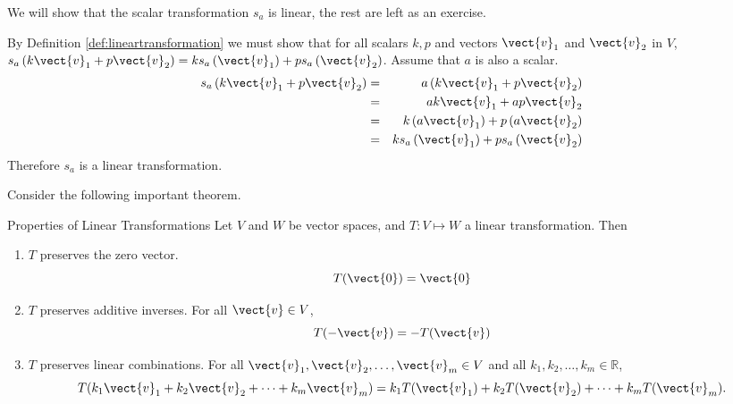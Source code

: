 \begin{solution}
We will show that the scalar transformation $s_a$ is linear, the rest are left as an exercise. 

By Definition \ref{def:lineartransformation} we must show that for all scalars $k ,p $ and 
vectors $\vect{v}_1$ and $\vect{v}_2$ in $V$, $s_a\left( k \vect{v}_1 + p \vect{v}_2 \right) = k s_a\left(\vect{v}_1\right)+ p s_a\left(\vect{v}_{2} \right)$. Assume that $a$ is also a scalar. 
\begin{eqnarray*}
s_a\left( k \vect{v}_1 + p \vect{v}_2 \right) &=& a \left( k \vect{v}_1 + p \vect{v}_2 \right) \\
&=&  ak \vect{v}_1 + ap \vect{v}_2  \\
 &=&  k \left(a \vect{v}_1\right) + p\left(a \vect{v}_2\right)  \\
&=& k s_a\left( \vect{v}_1 \right)  + p s_a \left(\vect{v}_2 \right)
\end{eqnarray*}
Therefore $s_a$ is a linear transformation.
\end{solution}

Consider the following important theorem.

\begin{theorem}{Properties of Linear Transformations}\label{thm:properties}
Let $V$ and $W$ be vector spaces, and $T:V \mapsto W$ a linear
transformation. 
Then
\begin{enumerate}
\item $T$ preserves the zero vector.
\[
T(\vect{0})=\vect{0}
\]
\item $T$ preserves additive inverses. 
For all $\vect{v}\in V$, 
\[
T(-\vect{v})= -T(\vect{v})
\]
\item $T$ preserves linear combinations.
For all $\vect{v}_1, \vect{v}_2, \ldots, \vect{v}_m \in V$ and
all $k_1, k_2, \ldots, k_m\in\mathbb{R}$,
\[ T(k_1\vect{v}_1 + k_2\vect{v}_2 + \cdots + k_m\vect{v}_m)
= k_1T(\vect{v}_1) + k_2T(\vect{v}_2) + \cdots + k_mT(\vect{v}_m).\]
\end{enumerate}
\end{theorem}

